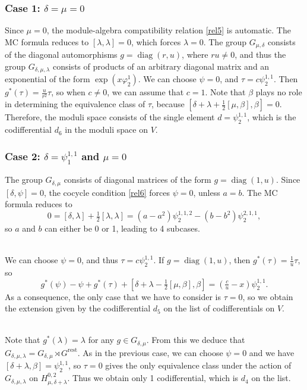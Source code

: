 \documentclass[12pt]{amsart}
\theoremstyle{definition}
\begin{document}
\subsubsection{Case 1: $\delta=\mu=0$}
Since $\mu=0$, the module-algebra compatibility relation \eqref{rel5} is automatic.
The MC formula reduces to $[\lambda,\lambda]=0$, which forces
$\lambda=0$. The group $G_{\mu,\delta}$ consists of the diagonal
automorphisms $g={\operatorname {diag}}(r,u)$, where $ru\ne0$, and thus the group
${\mbox{$G_{\delta,\mu,\lambda}$}}$ consists of products of an arbitrary diagonal matrix and
an exponential of the form $\exp(x{{\varphi}^{1}_{2}})$. We can choose $\psi=0$,
and $\tau=c{\psi^{{1,1}}_{2}}$. Then $g^*(\tau)=\tfrac u{r^2}\tau$, so when
$c\ne0$, we can assume that $c=1$. Note that $\beta$ plays no role
in determining the equivalence class of $\tau$, because
$[\delta+\lambda+\tfrac12[\mu,\beta],\beta]=0$. Therefore, the
moduli space consists of the single element $d={\psi^{{1,1}}_{2}}$, which is
the codifferential $d_6$ in the moduli space on $V$.
\subsubsection{Case 2: $\delta={\psi^{{1,1}}_{1}}$ and $\mu=0$}
The group ${\mbox{$G_{\delta,\mu}$}}$ consists of diagonal matrices of the form
$g={\operatorname {diag}}(1,u)$. Since $[\delta,\psi]=0$, the cocycle condition
\eqref{rel6} forces $\psi=0$, unless $a=b$.  The MC formula reduces to
\begin{equation*}
0=[\delta,\lambda]+\tfrac12[\lambda,\lambda]=(a-a^2){\psi^{{1,1,2}}_{2}}-(b-b^2){\psi^{{2,1,1}}_{2}},
\end{equation*}
so $a$ and $b$ can either be 0 or 1, leading to 4 subcases.

\\
We can choose $\psi=0$, and thus $\tau=c{\psi^{{1,1}}_{2}}$. If
$g={\operatorname {diag}}(1,u)$, then $g^*(\tau)=\tfrac1u\tau$, so
\begin{equation*}
g^*(\psi)-\psi+g^*(\tau)+[\delta+\lambda-\tfrac12[\mu,\beta],\beta]=(\tfrac
cu-x){\psi^{{1,1}}_{2}}.
\end{equation*}
As a consequence, the only case that we have to consider is
$\tau=0$, so we obtain the extension given by the codifferential
$d_5$ on the list of codifferentials on $V$.

\\
Note that $g^*(\lambda)=\lambda$ for any $g\in{\mbox{$G_{\delta,\mu}$}}$. From this
we deduce that ${\mbox{$G_{\delta,\mu,\lambda}$}}={\mbox{$G_{\delta,\mu}$}}\rtimes{\mbox{$G^{\text{rest}}$}}$.  As in the previous case,
we can choose $\psi=0$ and we have
$[\delta+\lambda,\beta]={\psi^{{1,1}}_{2}}$, so $\tau=0$ gives the only
equivalence class under the action of ${\mbox{$G_{\delta,\mu,\lambda}$}}$ on
$H_{\mu,{\delta+\lambda}}^{0,2}$. Thus we obtain only 1 codifferential, which is
$d_4$ on the list.
\end{document}
